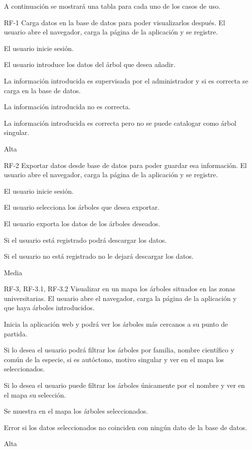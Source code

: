 A continuación se mostrará una tabla para cada uno de los casos de uso.
\newpage


{RF-1}
{Carga datos en la base de datos para poder visualizarlos después.}
{El usuario abre el navegador, carga la página de la aplicación y se registre.}
{
	\item El usuario inicie sesión.
	\item El usuario introduce los datos del árbol que desea añadir.
}
{La información introducida es supervisada por el administrador y si es correcta se carga en la base de datos.}
{
	\item La información introducida no es correcta.
	\item La información introducida es correcta pero no se puede catalogar como árbol singular.
}
{Alta}

\newpage


{RF-2}
{Exportar datos desde base de datos para poder guardar esa información.}
{El usuario abre el navegador, carga la página de la aplicación y se registre.}
{
	\item El usuario inicie sesión.
	\item El usuario selecciona los árboles que desea exportar.
	\item El usuario exporta los datos de los árboles deseados.
}
{Si el usuario está registrado podrá descargar los datos.}
{
	\item Si el usuario no está registrado no le dejará descargar los datos.
}
{Media}

\newpage


{RF-3, RF-3.1, RF-3.2}
{Visualizar en un mapa los árboles situados en las zonas universitarias.}
{El usuario abre el navegador, carga la página de la aplicación y que haya árboles introducidos.}
{
	\item Inicia la aplicación web y podrá ver los árboles más cercanos a su punto de partida.
	\item Si lo desea el usuario podrá filtrar los árboles por familia, nombre científico y común de la especie, si es autóctono, motivo singular y ver en el mapa los seleccionados.
	\item Si lo desea el usuario puede filtrar los árboles únicamente por el nombre y ver en el mapa su selección.
}
{Se muestra en el mapa los árboles seleccionados.}
{
	\item Error si los datos seleccionados no coinciden con ningún dato de la base de datos.
}
{Alta}

